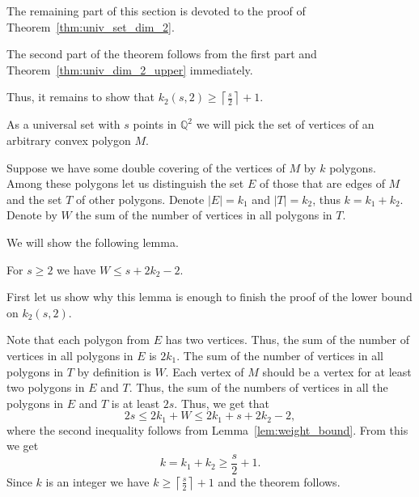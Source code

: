 \documentclass[11pt]{article}
\newcommand{\bb}[1]{\mathbb{#1}}
\begin{document}
The remaining part of this section is devoted to the proof of Theorem~\ref{thm:univ_set_dim_2}.

The second part of the theorem follows from the first part and Theorem~\ref{thm:univ_dim_2_upper} immediately. 

Thus, it remains to show that $k_2(s,2) \geq \left\lceil \frac s2 \right\rceil + 1$.

As a universal set with $s$ points in $\bb{Q}^2$ we will pick the set of vertices of an arbitrary convex polygon $M$.



Suppose we have some double covering of the vertices of $M$ by $k$ polygons. Among these polygons let us distinguish the set $E$ of those that are edges of $M$ and the set $T$ of other polygons. Denote $|E|=k_1$ and $|T|=k_2$, thus $k=k_1+k_2$. 
Denote by $W$ the sum of the number of vertices in all polygons in $T$.

We will show the following lemma.

\begin{lemma} \label{lem:weight_bound}
For $s\geq 2$ we have $W \leq s+2k_2 -2$.
\end{lemma}

First let us show why this lemma is enough to finish the proof of the lower bound on $k_2(s,2)$.

Note that each polygon from $E$ has two vertices. Thus, the sum of the number of vertices in all polygons in $E$ is $2k_1$. The sum of the number of vertices in all polygons in $T$ by definition is $W$. Each vertex of $M$ should be a vertex for at least two polygons in $E$ and $T$. Thus, the sum of the numbers of vertices in all the polygons in $E$ and $T$ is at least $2s$. 
Thus, we get that
$$
2s \leq 2k_1 + W \leq 2 k_1 + s+2k_2 -2,
$$
where the second inequality follows from Lemma~\ref{lem:weight_bound}.
From this we get 
$$
k = k_1 + k_2 \geq \frac s2 +1.
$$
Since $k$ is an integer we have $k \geq \left\lceil\frac s2 \right\rceil +1$ and the theorem follows.
\end{document}
